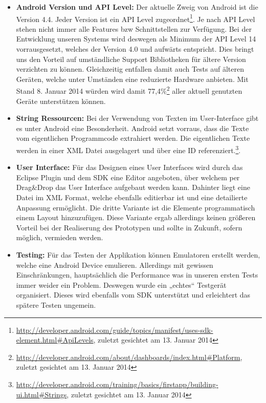\begin{itemize}
	\item \textbf{Android Version und API Level:} Der aktuelle Zweig von Android ist die Version 4.4. Jeder Version ist ein API Level zugeordnet\footnote{\url{http://developer.android.com/guide/topics/manifest/uses-sdk-element.html\#ApiLevels}, zuletzt gesichtet am 13. Januar 2014}. Je nach API Level stehen nicht immer alle Features bzw Schnittstellen zur Verfügung. Bei der Entwicklung unseren Systems wird deswegen als Minimum der API Level 14 vorrausgesetzt, welches der Version 4.0 und aufwärts entspricht. Dies bringt uns den Vorteil auf umständliche Support Bibliotheken für ältere Version verzichten zu können. Gleichzeitig entfallen damit auch Tests auf älteren Geräten, welche unter Umständen eine reduzierte Hardware anbieten. Mit Stand 8. Januar 2014 würden wird damit 77,4\%\footnote{\url{http://developer.android.com/about/dashboards/index.html\#Platform}, zuletzt gesichtet am 13. Januar 2014} aller aktuell genutzten Geräte unterstützen können.
	\item \textbf{String Ressourcen:} Bei der Verwendung von Texten im User-Interface gibt es unter Android eine Besonderheit. Android setzt vorraus, dass die Texte vom eigentlichen Programmcode extrahiert werden. Die eigentlichen Texte werden in einer XML Datei ausgelagert und über eine ID referenziert.\footnote{\url{http://developer.android.com/training/basics/firstapp/building-ui.html\#Strings}, zuletzt gesichtet am 13. Januar 2014}.
	\item \textbf{User Interface:} Für das Designen eines User Interfaces wird durch das Eclipse Plugin und dem SDK eine Editor angeboten, über welchem per Drag\&Drop das User Interface aufgebaut werden kann. Dahinter liegt eine Datei im XML Format, welche ebenfalls editierbar ist und eine detailierte Anpassung ermöglicht. Die dritte Variante ist die Elemente programmatisch einem Layout hinzuzufügen. Diese Variante ergab allerdings keinen größeren Vorteil bei der Realiserung des Prototypen und sollte in Zukunft, sofern möglich, vermieden werden.
	\item \textbf{Testing:} Für das Testen der Applikation können Emulatoren erstellt werden, welche eine Android Device emulieren. Allerdings mit gewissen Einschränkungen, hauptsächlich die Performance was in unseren ersten Tests immer weider ein Problem. Deswegen wurde ein „echtes“ Testgerät organisiert. Dieses wird ebenfalls vom SDK unterstützt und erleichtert das spätere Testen ungemein.
\end{itemize}


